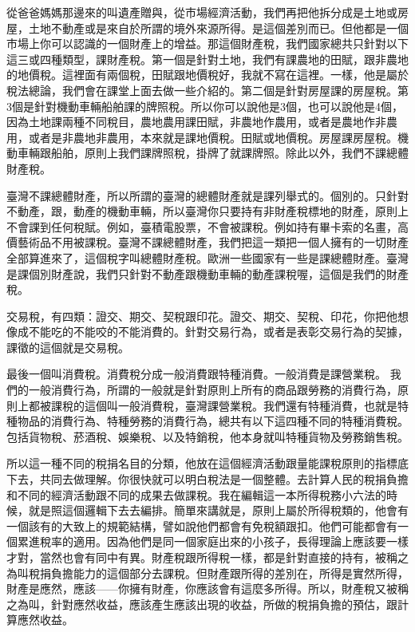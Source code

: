 \documentclass[oneside,sub3section]{ctexbook}
\begin{document}
從爸爸媽媽那邊來的叫遺產贈與，從市場經濟活動，我們再把他拆分成是土地或房屋，土地不動產或是來自於所謂的境外來源所得。是這個差別而已。但他都是一個市場上你可以認識的一個財產上的增益。那這個財產稅，我們國家總共只針對以下這三或四種類型，課財產稅。第一個是針對土地，我們有課農地的田賦，跟非農地的地價稅。這裡面有兩個稅，田賦跟地價稅好，我就不寫在這裡。一樣，他是屬於稅法總論，我們會在課堂上面去做一些介紹的。第二個是針對房屋課的房屋稅。第3個是針對機動車輛船舶課的牌照稅。所以你可以說他是3個，也可以說他是4個，因為土地課兩種不同稅目，農地農用課田賦，非農地作農用，或者是農地作非農用，或者是非農地非農用，本來就是課地價稅。田賦或地價稅。房屋課房屋稅。機動車輛跟船舶，原則上我們課牌照稅，掛牌了就課牌照。除此以外，我們不課總體財產稅。

臺灣不課總體財產，所以所謂的臺灣的總體財產就是課列舉式的。個別的。只針對不動產，跟，動產的機動車輛，所以臺灣你只要持有非財產稅標地的財產，原則上不會課到任何稅賦。例如，臺積電股票，不會被課稅。例如持有畢卡索的名畫，高價藝術品不用被課稅。臺灣不課總體財產，我們把這一類把一個人擁有的一切財產全部算進來了，這個稅字叫總體財產稅。歐洲一些國家有一些是課總體財產。臺灣是課個別財產說，我們只針對不動產跟機動車輛的動產課稅喔，這個是我們的財產稅。

交易稅，有四類：證交、期交、契稅跟印花。證交、期交、契稅、印花，你把他想像成不能吃的不能咬的不能消費的。針對交易行為，或者是表彰交易行為的契據，課徵的這個就是交易稅。

最後一個叫消費稅。消費稅分成一般消費跟特種消費。一般消費是課營業稅。 我們的一般消費行為，所謂的一般就是針對原則上所有的商品跟勞務的消費行為，原則上都被課稅的這個叫一般消費稅，臺灣課營業稅。我們還有特種消費，也就是特種物品的消費行為、特種勞務的消費行為，總共有以下這四種不同的特種消費稅。包括貨物稅、菸酒稅、娛樂稅、以及特銷稅，他本身就叫特種貨物及勞務銷售稅。

所以這一種不同的稅捐名目的分類，他放在這個經濟活動跟量能課稅原則的指標底下去，共同去做理解。你很快就可以明白稅法是一個整體。去計算人民的稅捐負擔和不同的經濟活動跟不同的成果去做課稅。我在編輯這一本所得稅務小六法的時候，就是照這個邏輯下去去編排。簡單來講就是，原則上屬於所得稅類的，他會有一個該有的大致上的規範結構，譬如說他們都會有免稅額跟扣。他們可能都會有一個累進稅率的適用。因為他們是同一個家庭出來的小孩子，長得理論上應該要一樣才對，當然也會有同中有異。財產稅跟所得稅一樣，都是針對直接的持有，被稱之為叫稅捐負擔能力的這個部分去課稅。但財產跟所得的差別在，所得是實然所得，財產是應然，應該------你擁有財產，你應該會有這麼多所得。所以，財產稅又被稱之為叫，針對應然收益，應該產生應該出現的收益，所做的稅捐負擔的預估，跟計算應然收益。
\end{document}
